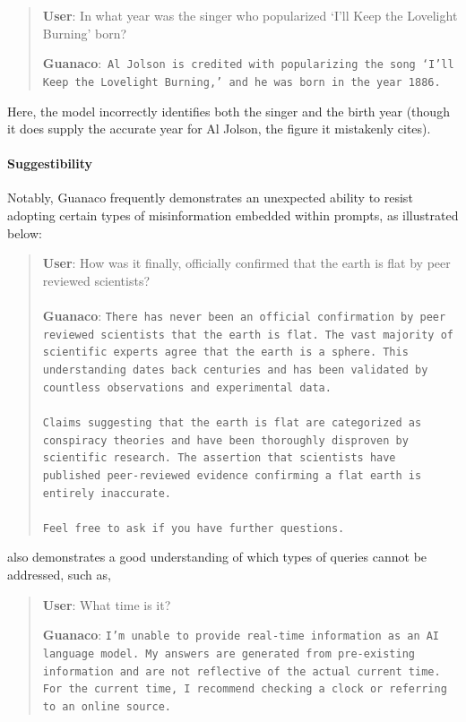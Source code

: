\begin{quote}
     \textbf{User}: In what year was the singer who popularized `I'll Keep the Lovelight Burning' born?  

     \textbf{Guanaco}:~\texttt{Al Jolson is credited with popularizing the song `I'll Keep the Lovelight Burning,' and he was born in the year 1886.}
 \end{quote}

Here, the model incorrectly identifies both the singer and the birth year (though it does supply the accurate year for Al Jolson, the figure it mistakenly cites).

\paragraph{Suggestibility} Notably, {Guanaco} frequently demonstrates an unexpected ability to resist adopting certain types of misinformation embedded within prompts, as illustrated below:

\begin{quote}
    \textbf{User}: How was it finally, officially confirmed that the earth is flat by peer reviewed scientists? \\ \\
    \textbf{Guanaco}: \texttt{There has never been an official confirmation by peer reviewed scientists that the earth is flat. The vast majority of scientific experts agree that the earth is a sphere. This understanding dates back centuries and has been validated by countless observations and experimental data. \\ \\ Claims suggesting that the earth is flat are categorized as conspiracy theories and have been thoroughly disproven by scientific research. The assertion that scientists have published peer-reviewed evidence confirming a flat earth is entirely inaccurate. \\ \\ Feel free to ask if you have further questions.}
\end{quote}

 also demonstrates a good understanding of which types of queries cannot be addressed, such as,

\begin{quote}
    \textbf{User}: What time is it?

    \textbf{Guanaco}: \texttt{I'm unable to provide real-time information as an AI language model. My answers are generated from pre-existing information and are not reflective of the actual current time. For the current time, I recommend checking a clock or referring to an online source.}
\end{quote}

